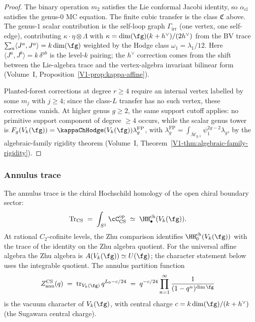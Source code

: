 \begin{proof}
The binary operation $m_2$ satisfies the Lie conformal Jacobi identity,
so $\alpha_{\mathrm{cl}}$ satisfies the genus-$0$ MC equation. The
finite cubic transfer is the class $\mathfrak C$ above. The genus-$1$
scalar contribution is the self-loop graph $\Gamma_{\mathrm{irr}}$
\textup{(}one vertex, one self-edge\textup{)}, contributing
$\kappa \cdot \eta \otimes \Lambda$ with
$\kappa = \dim(\fg)(k + h^\vee)/(2h^\vee)$ from the BV trace
$\sum_a \langle J^a, J^a \rangle = k\dim(\fg)$ weighted by the Hodge
class $\omega_1 = \lambda_1/12$. Here
$\langle J^a, J^b \rangle = k\,\delta^{ab}$ is the level-$k$ pairing;
the $h^\vee$ correction comes from the shift between the Lie-algebra
trace and the vertex-algebra invariant bilinear form
(Volume~I, Proposition~\ref*{V1-prop:kappa-affine}).

Planted-forest corrections at degree $r \ge 4$ require an internal
vertex labelled by some $m_j$ with $j \ge 4$; since the class-$L$
transfer has no such vertex, these corrections vanish. At higher genus
$g \ge 2$, the same support cutoff applies: no primitive support
component of degree $\ge4$ occurs, while the scalar genus tower is
$F_g(V_k(\fg)) = \kappaChHodge(V_k(\fg))\lambda_g^{\mathrm{FP}}$, with
$\lambda_g^{\mathrm{FP}}=\int_{\overline{\mathcal{M}}_{g,1}}\psi_1^{2g-2}\lambda_g$,
by the algebraic-family rigidity theorem
(Volume~I, Theorem~\ref*{V1-thm:algebraic-family-rigidity}).
\end{proof}

\subsubsection*{Annulus trace}

The annulus trace is the chiral Hochschild homology of the open
chiral boundary sector:
\begin{equation}\label{eq:cs-annulus-trace}
\operatorname{Tr}_{\mathrm{CS}}
\;=\;
\int_{S^1} \cC_{\mathrm{CS}}^{\mathrm{op}}
\;\simeq\;
\HH^{\mathrm{ch}}_\bullet(V_k(\fg)).
\end{equation}
At rational $C_2$-cofinite levels, the Zhu comparison identifies
$\HH^{\mathrm{ch}}_0(V_k(\fg))$ with the trace of the identity on the
Zhu algebra quotient. For the universal affine algebra the Zhu algebra
is $A(V_k(\fg)) \simeq U(\fg)$; the character statement below uses the
integrable quotient.
The annulus partition function
\begin{equation}\label{eq:cs-annulus-partition}
Z_{\mathrm{ann}}^{\mathrm{CS}}(q)
\;=\;
\operatorname{tr}_{V_k(\fg)} q^{L_0 - c/24}
\;=\;
q^{-c/24} \prod_{n=1}^{\infty} \frac{1}{(1-q^n)^{\dim\fg}}
\end{equation}
is the vacuum character of $V_k(\fg)$, with central charge
$c = k\dim(\fg)/(k + h^\vee)$ (the Sugawara central charge).

